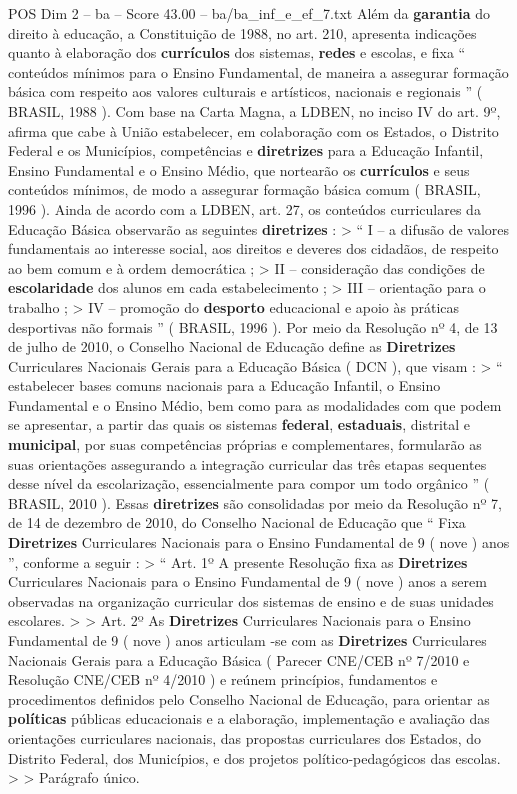 \begin{textsample}{POS Dim 2 – ba – Score 43.00 – ba/ba\_inf\_e\_ef\_7.txt}
Além da \textbf{garantia} do direito à educação, a Constituição de 1988, no art. 210, apresenta indicações quanto à elaboração dos \textbf{currículos} dos sistemas, \textbf{redes} e escolas, e fixa “ conteúdos mínimos para o Ensino Fundamental, de maneira a assegurar formação básica com respeito aos valores culturais e artísticos, nacionais e regionais ” ( BRASIL, 1988 ).
Com base na Carta Magna, a LDBEN, no inciso IV do art. 9º, afirma que cabe à União estabelecer, em colaboração com os Estados, o Distrito Federal e os Municípios, competências e \textbf{diretrizes} para a Educação Infantil, Ensino Fundamental e o Ensino Médio, que nortearão os \textbf{currículos} e seus conteúdos mínimos, de modo a assegurar formação básica comum ( BRASIL, 1996 ).
Ainda de acordo com a LDBEN, art. 27, os conteúdos curriculares da Educação Básica observarão as seguintes \textbf{diretrizes} : > “ I – a difusão de valores fundamentais ao interesse social, aos direitos e deveres dos cidadãos, de respeito ao bem comum e à ordem democrática ; > II – consideração das condições de \textbf{escolaridade} dos alunos em cada estabelecimento ; > III – orientação para o trabalho ; > IV – promoção do \textbf{desporto} educacional e apoio às práticas desportivas não formais ” ( BRASIL, 1996 ).
Por meio da Resolução nº 4, de 13 de julho de 2010, o Conselho Nacional de Educação define as \textbf{Diretrizes} Curriculares Nacionais Gerais para a Educação Básica ( DCN ), que visam : > “ estabelecer bases comuns nacionais para a Educação Infantil, o Ensino Fundamental e o Ensino Médio, bem como para as modalidades com que podem se apresentar, a partir das quais os sistemas \textbf{federal}, \textbf{estaduais}, distrital e \textbf{municipal}, por suas competências próprias e complementares, formularão as suas orientações assegurando a integração curricular das três etapas sequentes desse nível da escolarização, essencialmente para compor um todo orgânico ” ( BRASIL, 2010 ).
Essas \textbf{diretrizes} são consolidadas por meio da Resolução nº 7, de 14 de dezembro de 2010, do Conselho Nacional de Educação que “ Fixa \textbf{Diretrizes} Curriculares Nacionais para o Ensino Fundamental de 9 ( nove ) anos ”, conforme a seguir : > “ Art. 1º A presente Resolução fixa as \textbf{Diretrizes} Curriculares Nacionais para o Ensino Fundamental de 9 ( nove ) anos a serem observadas na organização curricular dos sistemas de ensino e de suas unidades escolares. > > Art. 2º As \textbf{Diretrizes} Curriculares Nacionais para o Ensino Fundamental de 9 ( nove ) anos articulam -se com as \textbf{Diretrizes} Curriculares Nacionais Gerais para a Educação Básica ( Parecer CNE/CEB nº 7/2010 e Resolução CNE/CEB nº 4/2010 ) e reúnem princípios, fundamentos e procedimentos definidos pelo Conselho Nacional de Educação, para orientar as \textbf{políticas} públicas educacionais e a elaboração, implementação e avaliação das orientações curriculares nacionais, das propostas curriculares dos Estados, do Distrito Federal, dos Municípios, e dos projetos político-pedagógicos das escolas. > > Parágrafo único.

\end{textsample}

